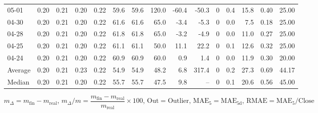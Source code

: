 \begin{threeparttable}
{\begin{tabular}{lrrrrrrrrrrrrrr}
  05-01 &          0.20 &          0.21 &          0.20 &        0.22 &                59.6 &               59.6 &               120.0 &      -60.4 &        -50.3 &              0 &                 0.4 &             15.8 &            0.40 &                  25.00 \\
  04-30 &          0.20 &          0.21 &          0.20 &        0.22 &                61.6 &               61.6 &                65.0 &       -3.4 &         -5.3 &              0 &                 0.0 &              7.5 &            0.18 &                  25.00 \\
  04-28 &          0.20 &          0.21 &          0.20 &        0.22 &                61.8 &               61.8 &                65.0 &       -3.2 &         -4.9 &              0 &                 0.0 &             11.0 &            0.27 &                  25.00 \\
  04-25 &          0.20 &          0.21 &          0.20 &        0.22 &                61.1 &               61.1 &                50.0 &       11.1 &         22.2 &              0 &                 0.1 &             12.6 &            0.32 &                  25.00 \\
  04-24 &          0.20 &          0.21 &          0.20 &        0.22 &                60.9 &               60.9 &                60.0 &        0.9 &          1.4 &              0 &                 0.0 &             11.9 &            0.30 &                  20.00 \\
Average &          0.20 &          0.21 &          0.23 &        0.22 &                54.9 &               54.9 &                48.2 &        6.8 &        317.4 &              0 &                 0.2 &             27.3 &            0.69 &                  44.17 \\
 Median &          0.20 &          0.21 &          0.20 &        0.22 &                55.7 &               55.7 &                47.5 &        9.8 &           -- &              0 &                 0.1 &             20.6 &            0.56 &                  45.00 \\
\bottomrule
\end{tabular}
}
\begin{tablenotes}\footnotesize
\item $m_\Delta=m_{\text{fin}}-m_{\text{real}}$,
$m_\Delta/m=\dfrac{m_{\text{fin}}-m_{\text{real}}}{m_{\text{real}}}\times100$,
$\mathrm{Out}=\text{Outlier}$,
$\mathrm{MAE}_5=\mathrm{MAE}_{5\text{d}}$,
$\mathrm{RMAE}=\mathrm{MAE}_5/\text{Close}$
\end{tablenotes}
\end{threeparttable}
\endgroup

